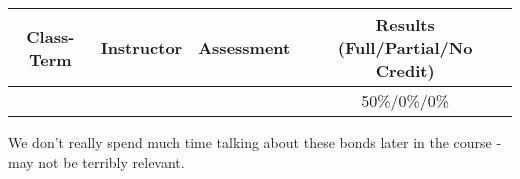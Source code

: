 
\begin{outcomes}
	\begin{center}
		\begin{tabular}{cccc}
			\hline\hline
                Class-Term & Instructor & Assessment & Results (Full/Partial/No Credit) \\
			\hline
                 &  &  & 50\%/0\%/0\%\\
			\hline
		\end{tabular}
	\end{center}
\end{outcomes}

\begin{comments}

We don't really spend much time talking about these bonds later in the course - may not be terribly relevant.
	
\end{comments}